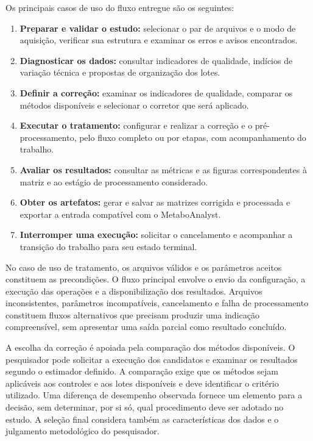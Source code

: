 Os principais casos de uso do fluxo entregue são os seguintes:
\begin{enumerate}
\item \textbf{Preparar e validar o estudo:} selecionar o par de arquivos e o modo de aquisição, verificar sua estrutura e examinar os erros e avisos encontrados.
\item \textbf{Diagnosticar os dados:} consultar indicadores de qualidade, indícios de variação técnica e propostas de organização dos lotes.
\item \textbf{Definir a correção:} examinar os indicadores de qualidade, comparar os métodos disponíveis e selecionar o corretor que será aplicado.
\item \textbf{Executar o tratamento:} configurar e realizar a correção e o pré-processamento, pelo fluxo completo ou por etapas, com acompanhamento do trabalho.
\item \textbf{Avaliar os resultados:} consultar as métricas e as figuras correspondentes à matriz e ao estágio de processamento considerado.
\item \textbf{Obter os artefatos:} gerar e salvar as matrizes corrigida e processada e exportar a entrada compatível com o MetaboAnalyst.
\item \textbf{Interromper uma execução:} solicitar o cancelamento e acompanhar a transição do trabalho para seu estado terminal.
\end{enumerate}

No caso de uso de tratamento, os arquivos válidos e os parâmetros aceitos constituem as precondições. O fluxo principal envolve o envio da configuração, a execução das operações e a disponibilização dos resultados. Arquivos inconsistentes, parâmetros incompatíveis, cancelamento e falha de processamento constituem fluxos alternativos que precisam produzir uma indicação compreensível, sem apresentar uma saída parcial como resultado concluído.

A escolha da correção é apoiada pela comparação dos métodos disponíveis. O pesquisador pode solicitar a execução dos candidatos e examinar os resultados segundo o estimador definido. A comparação exige que os métodos sejam aplicáveis aos controles e aos lotes disponíveis e deve identificar o critério utilizado. Uma diferença de desempenho observada fornece um elemento para a decisão, sem determinar, por si só, qual procedimento deve ser adotado no estudo. A seleção final considera também as características dos dados e o julgamento metodológico do pesquisador.

